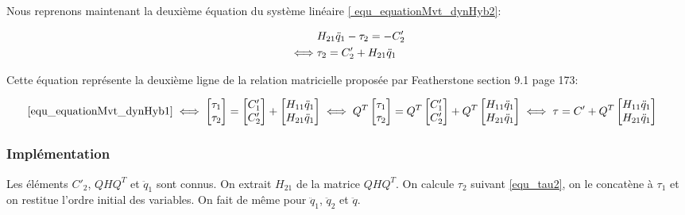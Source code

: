 \documentclass{report}
\begin{document}
Nous reprenons maintenant la deuxième équation du système linéaire \eqref{   equ_equationMvt_dynHyb2}:

\begin{spacing}{1.5}
\begin{align}
&H_{21} \ddot{q}_1 - \tau_2 = -C'_2 \notag \\
\iff
&\tau_2 = C'_2 + H_{21} \ddot{q}_1 \label{equ_tau2}
\end{align}
\end{spacing}

Cette équation représente la deuxième ligne de la relation matricielle proposée par Featherstone \cite{bib_featherstone} section 9.1 page 173:

\begin{align}
\eqref{equ_equationMvt_dynHyb1}
&\iff
\begin{bmatrix}
\tau_1 \\ 
\tau_2
\end{bmatrix} 
=
\begin{bmatrix}
C'_1 \\ 
C'_2
\end{bmatrix} 
+
\begin{bmatrix}
H_{11} \ddot{q}_1 \\ 
H_{21} \ddot{q}_1
\end{bmatrix} \iff
Q^T
\begin{bmatrix}
\tau_1 \\ 
\tau_2
\end{bmatrix} 
=
Q^T
\begin{bmatrix}
C'_1 \\ 
C'_2
\end{bmatrix} 
+
Q^T
\begin{bmatrix}
H_{11} \ddot{q}_1 \\ 
H_{21} \ddot{q}_1
\end{bmatrix} \iff \tau = C'
+
Q^T
\begin{bmatrix}
H_{11} \ddot{q}_1 \\ 
H_{21} \ddot{q}_1
\end{bmatrix}
\end{align}


\subsubsection{Implémentation}

Les éléments $C'_2$, $QHQ^T$ et $\ddot{q}_1$ sont connus. On extrait $H_{21}$ de la matrice $QHQ^T$. On calcule $\tau_2$ suivant \eqref{equ_tau2}, on le concatène à $\tau_1$ et on restitue l'ordre initial des variables. On fait de même pour $\ddot{q}_1$, $\ddot{q}_2$ et $\ddot{q}$.
\end{document}
